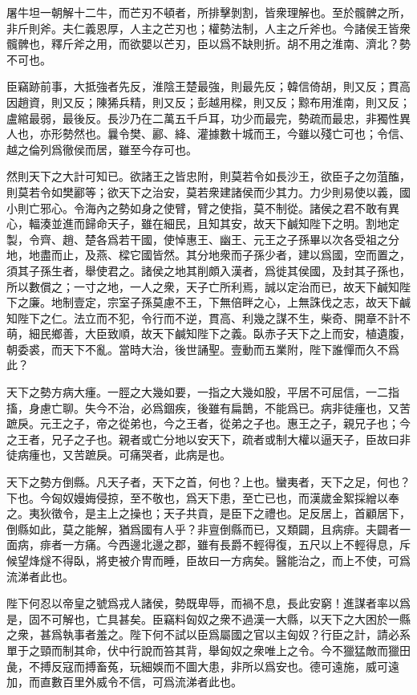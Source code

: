 \documentclass[12pt,a4paper]{ctexbook}
\begin{document}
屠牛坦一朝解十二牛，而芒刃不頓者，所排擊剝割，皆衆理解也。至於髖髀之所，非斤則斧。夫仁義恩厚，人主之芒刃也；權勢法制，人主之斤斧也。今諸侯王皆衆髖髀也，釋斤斧之用，而欲嬰以芒刃，臣以爲不缺則折。胡不用之淮南、濟北？勢不可也。\par
臣竊跡前事，大抵強者先反，淮陰王楚最強，則最先反；韓信倚胡，則又反；貫高因趙資，則又反；陳狶兵精，則又反；彭越用樑，則又反；黥布用淮南，則又反；盧綰最弱，最後反。長沙乃在二萬五千戶耳，功少而最完，勢疏而最忠，非獨性異人也，亦形勢然也。曩令樊、酈、絳、灌據數十城而王，今雖以殘亡可也；令信、越之倫列爲徹侯而居，雖至今存可也。\par
然則天下之大計可知已。欲諸王之皆忠附，則莫若令如長沙王，欲臣子之勿菹醢，則莫若令如樊酈等；欲天下之治安，莫若衆建諸侯而少其力。力少則易使以義，國小則亡邪心。令海內之勢如身之使臂，臂之使指，莫不制從。諸侯之君不敢有異心，輻湊並進而歸命天子，雖在細民，且知其安，故天下鹹知陛下之明。割地定製，令齊、趙、楚各爲若干國，使悼惠王、幽王、元王之子孫畢以次各受祖之分地，地盡而止，及燕、樑它國皆然。其分地衆而子孫少者，建以爲國，空而置之，須其子孫生者，舉使君之。諸侯之地其削頗入漢者，爲徙其侯國，及封其子孫也，所以數償之；一寸之地，一人之衆，天子亡所利焉，誠以定治而已，故天下鹹知陛下之廉。地制壹定，宗室子孫莫慮不王，下無倍畔之心，上無誅伐之志，故天下鹹知陛下之仁。法立而不犯，令行而不逆，貫高、利幾之謀不生，柴奇、開章不計不萌，細民鄉善，大臣致順，故天下鹹知陛下之義。臥赤子天下之上而安，植遺腹，朝委裘，而天下不亂。當時大治，後世誦聖。壹動而五業附，陛下誰憚而久不爲此？\par
天下之勢方病大瘇。一脛之大幾如要，一指之大幾如股，平居不可屈信，一二指搐，身慮亡聊。失今不治，必爲錮疾，後雖有扁鵲，不能爲已。病非徒瘇也，又苦蹠戾。元王之子，帝之從弟也，今之王者，從弟之子也。惠王之子，親兄子也；今之王者，兄子之子也。親者或亡分地以安天下，疏者或制大權以逼天子，臣故曰非徒病瘇也，又苦蹠戾。可痛哭者，此病是也。\par
天下之勢方倒縣。凡天子者，天下之首，何也？上也。蠻夷者，天下之足，何也？下也。今匈奴嫚娒侵掠，至不敬也，爲天下患，至亡已也，而漢歲金絮採繒以奉之。夷狄徵令，是主上之操也；天子共貢，是臣下之禮也。足反居上，首顧居下，倒縣如此，莫之能解，猶爲國有人乎？非亶倒縣而已，又類闢，且病痱。夫闢者一面病，痱者一方痛。今西邊北邊之郡，雖有長爵不輕得復，五尺以上不輕得息，斥候望烽燧不得臥，將吏被介冑而睡，臣故曰一方病矣。醫能治之，而上不使，可爲流涕者此也。\par
陛下何忍以帝皇之號爲戎人諸侯，勢既卑辱，而禍不息，長此安窮！進謀者率以爲是，固不可解也，亡具甚矣。臣竊料匈奴之衆不過漢一大縣，以天下之大困於一縣之衆，甚爲執事者羞之。陛下何不試以臣爲屬國之官以主匈奴？行臣之計，請必系單于之頸而制其命，伏中行說而笞其背，舉匈奴之衆唯上之令。今不獵猛敵而獵田彘，不搏反寇而搏畜菟，玩細娛而不圖大患，非所以爲安也。德可遠施，威可遠加，而直數百里外威令不信，可爲流涕者此也。\par
\end{document}
